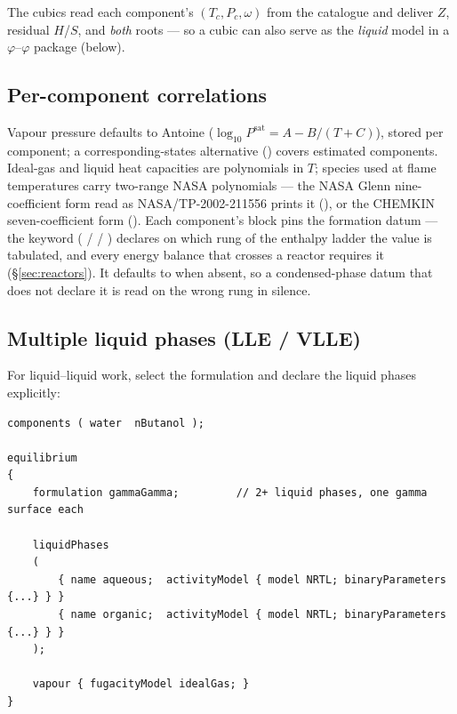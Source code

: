 \documentclass[11pt,a4paper]{article}
\begin{document}
The cubics read each component's $(T_c, P_c, \omega)$ from the
catalogue and deliver $Z$, residual $H$/$S$, and \emph{both} roots ---
so a cubic can also serve as the \emph{liquid} model in a $\varphi$--$\varphi$
package (below).

\subsection{Per-component correlations}

Vapour pressure defaults to Antoine
($\log_{10} P^{\mathrm{sat}} = A - B/(T+C)$), stored per component; a
corresponding-states alternative () covers estimated components.  Ideal-gas and liquid
heat capacities are polynomials in $T$; species used at flame
temperatures carry two-range NASA polynomials --- the NASA Glenn
nine-coefficient form read as NASA/TP-2002-211556 prints it
(), or the CHEMKIN seven-coefficient form
().  Each
component's
 block
pins the formation datum --- the  keyword
( /  / ) declares on
which rung of the enthalpy ladder the value is tabulated, and every energy
balance that crosses a reactor requires it (\S\ref{sec:reactors}).  It
defaults to  when absent, so a condensed-phase datum that
does not declare it is read on the wrong rung in silence.

\subsection{Multiple liquid phases (LLE / VLLE)}

For liquid--liquid work, select the  formulation and
declare the liquid phases explicitly:

\begin{lstlisting}[language=dict]
components ( water  nButanol );

equilibrium
{
    formulation gammaGamma;         // 2+ liquid phases, one gamma surface each

    liquidPhases
    (
        { name aqueous;  activityModel { model NRTL; binaryParameters {...} } }
        { name organic;  activityModel { model NRTL; binaryParameters {...} } }
    );

    vapour { fugacityModel idealGas; }
}
\end{lstlisting}
\end{document}
